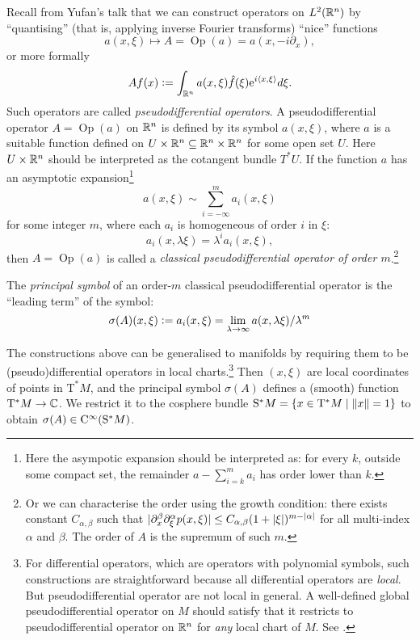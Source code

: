 \documentclass[reqno]{scrartcl}
\theoremstyle{definition}
\theoremstyle{remark}
\newcommand{\Op}{\operatorname{Op}}
\begin{document}
Recall from Yufan's talk that we can construct operators on $L^2(\mathbb{R}^n)$ by ``quantising'' (that is, applying inverse Fourier transforms) ``nice'' functions
\[ a(x,\xi)\mapsto A=\Op(a)=a(x,-i\partial_x), \]
or more formally
\[ Af(x)\mathrel{\vcentcolon=}\int_{\mathbb{R}^n}a(x,\xi)\hat{f}(\xi)\mathrm{e}^{i\langle x,\xi\rangle}d\xi. \]
Such operators are called \emph{pseudodifferential operators}. A pseudodifferential operator $A=\Op(a)$ on $\mathbb{R}^n$ is defined by its symbol $a(x,\xi)$, where $a$ is a suitable function defined on $U\times\mathbb{R}^n\subseteq\mathbb{R}^n\times \mathbb{R}^n$ for some open set $U$. Here $U\times\mathbb{R}^n$ should be interpreted as the cotangent bundle $T^*U$. If the function $a$ has an asymptotic expansion\footnote{Here the asympotic expansion should be interpreted as: for every $k$, outside some compact set, the remainder $a-\sum_{i=k}^{m}a_i$ has order lower than $k$.}
\[ a(x,\xi)\sim\sum_{i=-\infty}^{m}a_i(x,\xi) \]
for some integer $m$, where each $a_i$ is homogeneous of order $i$ in $\xi$:
\[ a_i(x,\lambda\xi)=\lambda^ia_i(x,\xi), \]
then $A=\Op(a)$ is called a \emph{classical pseudodifferential operator of order $m$}.\footnote{Or we can characterise the order using the growth condition: there exists constant $C_{\alpha,\beta}$ such that $\lvert\partial_x^\beta\partial_\xi^\alpha p(x,\xi)\rvert\leq C_{\alpha,\beta}(1+\lvert\xi\rvert)^{m-\lvert\alpha\rvert}$ for all multi-index $\alpha$ and $\beta$. The order of $A$ is the supremum of such $m$.}

The \emph{principal symbol} of an order-$m$ classical pseudodifferential operator is the ``leading term'' of the symbol:
\[ \sigma(A)(x,\xi)\mathrel{\vcentcolon=} a_i(x,\xi)=\lim_{\lambda\to\infty}a(x,\lambda\xi)/\lambda^m \]

The constructions above can be generalised to manifolds by requiring them to be (pseudo)differential operators in local charts.\footnote{For differential operators, which are operators with polynomial symbols, such constructions are straightforward because all differential operators are \emph{local}. But pseudodifferential operator are not local in general. A well-defined global pseudodifferential operator on $M$ should satisfy that it restricts to pseudodifferential operator on $\mathbb{R}^n$ for \emph{any} local chart of $M$. See \cite{treves2013introduction}.} Then $(x,\xi)$ are local coordinates of points in $\mathrm{T}^*M$, and the principal symbol $\sigma(A)$ defines a (smooth) function $\mathrm{T}^*M\to\mathbb{C}$. We restrict it to the cosphere bundle $\mathrm{S}^*M=\{x\in \mathrm{T}^*M\mid\lVert x\rVert=1\}$ to obtain $\sigma(A)\in\mathrm{C}^\infty(\mathrm{S}^*M)$. 
\end{document}
